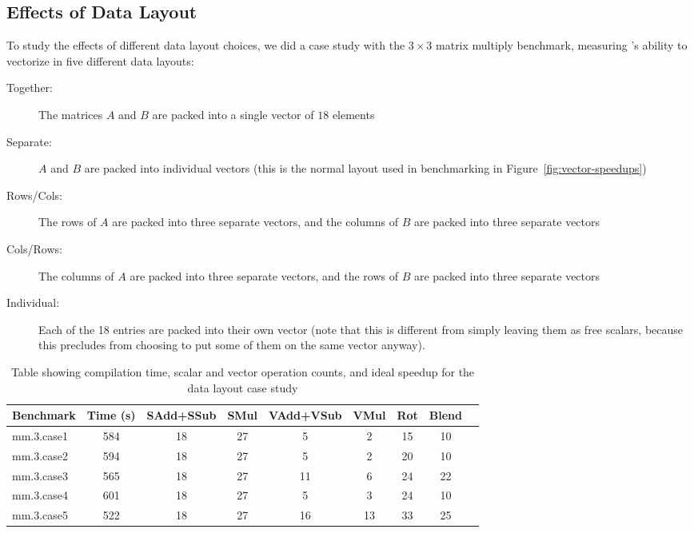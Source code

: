\subsection{Effects of Data Layout}\label{sec:effects-of-data-layout}
To study the effects of different data layout choices, we did a case study with the $3\times 3$ matrix multiply benchmark, measuring \system's ability to vectorize in five different data layouts:
\begin{description}
    \item[Together:] The matrices $A$ and $B$ are packed into a single vector of $18$ elements
    \item[Separate:] $A$ and $B$ are packed into individual vectors (this is the normal layout used in benchmarking in Figure~\ref{fig:vector-speedups})
    \item[Rows/Cols:] The rows of $A$ are packed into three separate vectors, and the columns of $B$ are packed into three separate vectors
    \item[Cols/Rows:] The columns of $A$ are packed into three separate vectors, and the rows of $B$ are packed into three separate vectors
    \item[Individual:] Each of the 18 entries are packed into their own vector (note that this is different from simply leaving them as free scalars, because this precludes \system from choosing to put some of them on the same vector anyway).     
\end{description}
\begin{table}
    \small
    \caption{Table showing compilation time, scalar and vector operation counts, and ideal speedup for the data layout case study}\label{tab:bigass-data-layout}
    \begin{tabular}{lcccccccc}
    \toprule
    Benchmark & Time (s) & SAdd+SSub & SMul & VAdd+VSub & VMul & Rot & Blend\\\midrule
    mm.3.case1 & 584 & 18 & 27 & 5 & 2 & 15 & 10\\
    mm.3.case2 & 594 & 18 & 27 & 5 & 2 & 20 & 10\\
    mm.3.case3 & 565 & 18 & 27 & 11 & 6 & 24 & 22\\
    mm.3.case4 & 601 & 18 & 27 & 5 & 3 & 24 & 10\\
    mm.3.case5 & 522 & 18 & 27 & 16 & 13 & 33 & 25\\\bottomrule
    \end{tabular}
\end{table}
